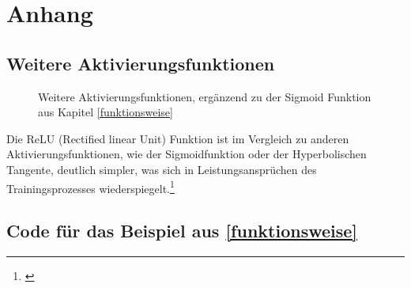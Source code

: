 \appendix
\label{Anhang}
\section{Anhang}

\subsection{Weitere Aktivierungsfunktionen}\label{anhang:weitereaktivierungsfunktionen}

\begin{figure}[h]
    \center
    
    \caption[Aktivierungsfunktionen]{Weitere Aktivierungsfunktionen, ergänzend zu der Sigmoid Funktion aus Kapitel \ref{funktionsweise}}
    \label{Aktivierungsfunktionen}%
\end{figure}

Die ReLU (Rectified linear Unit) Funktion ist im Vergleich zu anderen Aktivierungsfunktionen, wie der Sigmoidfunktion oder der Hyperbolischen Tangente, deutlich simpler, was sich in Leistungsansprüchen des Trainingsprozesses wiederspiegelt.\footnote{\cite{nnfs}}

\subsection{Code für das Beispiel aus \ref{funktionsweise}}\label{anhang:colab1}

